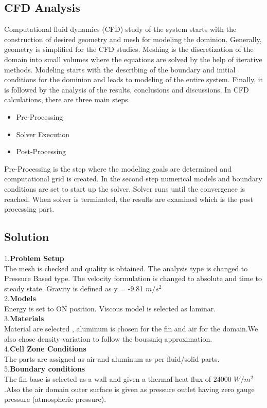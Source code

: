 \subsection{CFD Analysis}
Computational fluid dynamics (CFD) study of the system starts with the construction of
desired geometry and mesh for modeling the dominion. Generally, geometry is simplified
for the CFD studies. Meshing is the discretization of the domain into small volumes
where the equations are solved by the help of iterative methods. Modeling starts with the
describing of the boundary and initial conditions for the dominion and leads to modeling
of the entire system. Finally, it is followed by the analysis of the results, conclusions and
discussions.
In CFD calculations, there are three
main steps.
\begin{itemize}
	\item  Pre-Processing
 \item Solver Execution
\item  Post-Processing
\end{itemize}
Pre-Processing is the step where the
modeling goals are determined and
computational grid is created. In the second
step numerical models and boundary
conditions are set to start up the solver.
Solver runs until the convergence is reached.
When solver is terminated, the results are
examined which is the post processing part.
\subsection{Solution}

1.\textbf{Problem Setup}
\\
The mesh is checked and quality is obtained. The analysis type is changed
to Pressure Based type. The velocity formulation is changed to absolute and
time to steady state. Gravity is defined as y = -9.81 $m/s^2$
\\
2.\textbf{Models}
\\
Energy is set to ON position. Viscous model is selected as laminar.
\\
3.\textbf{Materials}
\\
Material are selected , aluminum is chosen for the fin and air for the domain.We also chose density variation to follow the boussniq approximation.
\\
4.\textbf{Cell Zone Conditions}
\\
The parts are assigned as air and aluminum as per fluid/solid parts.
\\
5.\textbf{Boundary conditions}
\\
The fin base is selected as a wall and given a thermal heat flux of 24000 $W / m^2 $.Also the air domain outer surface is given as pressure outlet having zero gauge pressure (atmospheric pressure).


